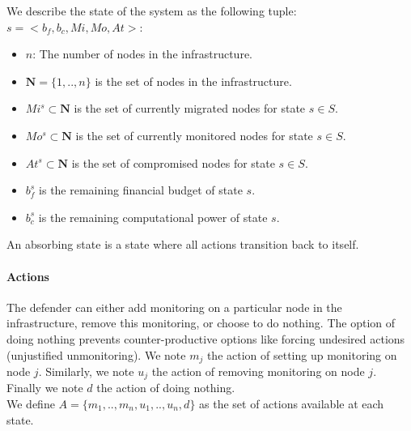 We describe the state of the system as the following tuple: $s=<b_f,b_c,Mi,Mo,At>$:
\begin{itemize}
    \item $n$: The number of nodes in the infrastructure.
    \item $\textbf{N} = \{1,..,n\}$ is the set of nodes in the infrastructure.
    \item $Mi^s \subset \textbf{N} $ is the set of currently migrated nodes for state $s\in S$.
    \item $Mo^s \subset \textbf{N}$ is the set of currently monitored nodes for state $s\in S$.
    \item $At^s \subset \textbf{N}$ is the set of compromised nodes for state $s \in S$.
    \item $b_f^s$ is the remaining financial budget of state $s$.
    \item $b_c^s$ is the remaining computational power of state $s$.
\end{itemize}

An absorbing state is a state where all actions transition back to itself.

\paragraph{Actions}
\label{sec:actionset}
The defender can either add monitoring on a particular node in the infrastructure, remove this monitoring, or choose to do nothing.
The option of doing nothing prevents counter-productive options like forcing undesired actions (\eg unjustified unmonitoring).
We note $m_j$ the action of setting up monitoring on node $j$. Similarly, we note $u_j$ the action of removing monitoring on node $j$.
Finally we note $d$ the action of doing nothing.
\\We define $A = \{m_1,..,m_n,u_1,..,u_n,d\}$ as the set of actions available at each state.


